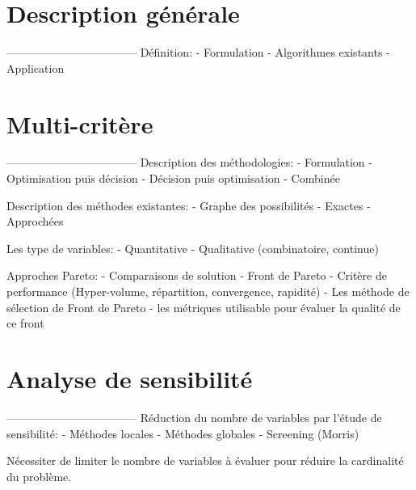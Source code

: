 
\section{Description générale} %
\label{sec:description_generale}
-----------------------------------
Définition:
 - Formulation
 - Algorithmes existants
 - Application




\section{Multi-critère} %
\label{sec:multi_critere}
-----------------------------------
Description des méthodologies:
 - Formulation
 - Optimisation puis décision
 - Décision puis optimisation
 - Combinée

Description des méthodes existantes:
 - Graphe des possibilités
 - Exactes
 - Approchées

Les type de variables:
 - Quantitative
 - Qualitative (combinatoire, continue)

Approches Pareto:
 - Comparaisons de solution
 - Front de Pareto
 - Critère de performance (Hyper-volume, répartition, convergence, rapidité)
 - Les méthode de sélection de Front de Pareto
 - les métriques utilisable pour évaluer la qualité de ce front



\section{Analyse de sensibilité} %
\label{sec:analyse_de_sensibilite}
-----------------------------------
Réduction du nombre de variables par l’étude de sensibilité:
 - Méthodes locales
 - Méthodes globales
 - Screening (Morris)

Nécessiter de limiter le nombre de variables à évaluer pour réduire la cardinalité
du problème.

